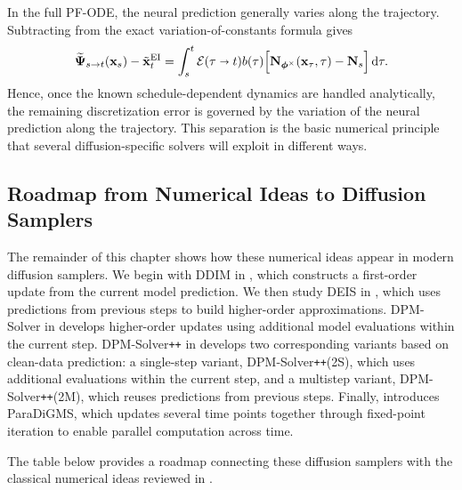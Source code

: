 In the full PF-ODE, the neural prediction generally varies along the
trajectory. Subtracting  from the exact
variation-of-constants formula gives
\begin{align}
\label{eq:ei-local-defect}
\widetilde{{\bm{\Psi}}}_{s\to t}({\mathbf{x}}_s)
-
\tilde{{\mathbf{x}}}_t^{\mathrm{EI}}
=
\int_s^t
\mathcal E(\tau\shortrightarrow t)b(\tau)
\Big[
{\mathbf{N}}_{\bm{\phi}^\times}({\mathbf{x}}_\tau,\tau)
-
{\mathbf{N}}_s
\Big]\mathop{}\!\mathrm{d}\tau.
\end{align}
Hence, once the known schedule-dependent dynamics are handled analytically,
the remaining discretization error is governed by the variation of the neural
prediction along the trajectory. This separation is the basic numerical
principle that several diffusion-specific solvers will exploit in different
ways.

\subsection{Roadmap from Numerical Ideas to Diffusion Samplers}
The remainder of this chapter shows how these numerical ideas appear in modern
diffusion samplers. We begin with DDIM in , which
constructs a first-order update from the current model prediction. We then study
DEIS in , which uses predictions from previous steps to
build higher-order approximations. DPM-Solver in  develops
higher-order updates using additional model evaluations within the current
step. DPM-Solver\texttt{++} in  develops two corresponding
variants based on clean-data prediction: a single-step variant,
DPM-Solver\texttt{++}(2S), which uses additional evaluations within the current
step, and a multistep variant, DPM-Solver\texttt{++}(2M), which reuses
predictions from previous steps. Finally,  introduces
ParaDiGMS, which updates several time points together through fixed-point
iteration to enable parallel computation across time.

The table below provides a roadmap connecting these diffusion samplers with
the classical numerical ideas reviewed in .


